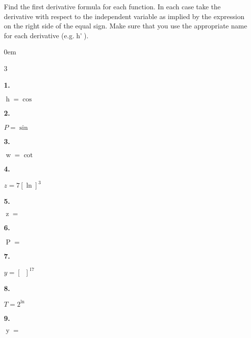 \documentclass[12pt,]{book}
\theoremstyle{plain}
\theoremstyle{definition}
\numberwithin{equation}{section}
\newenvironment{exercisegroup}%
{\medskip\noindent}%
{\par\bigskip}%
\newlength{\exercisegroupindent}%
\newlength{\exercisegroupitemwidth}%
\newenvironment{exercisegrouplist}%
{\vspace{-\partopsep}%
\begin{adjustwidth}{\exercisegroupindent}{0em}}%
{\end{adjustwidth}%
\vspace{-\partopsep}%
\vspace{\baselineskip}}%
\newenvironment{exercisegroupbycol}[1]%
{\begin{exercisegrouplist}%
\vspace{-\multicolsep}%
\begin{multicols}{#1}%
\setlength{\parindent}{0em}%
\setlength{\exercisegroupitemwidth}{\linewidth}}%
{\end{multicols}%
\vspace{-\multicolsep}%
\end{exercisegrouplist}}%
\newenvironment{exercisegroupitem}[1]%
{\begin{minipage}[t]{\exercisegroupitemwidth}
\vspace{0pt}%
{\bfseries#1}%
\rule{0pt}{\baselineskip}}{\strut%
\end{minipage}%
\hspace{\columnsep}}%
\providecommand\phantomsection{}
\newcommand{\fe}[2]{\mathop{{#1}{\left(#2\right)}}}
\newcommand{\fd}[1]{#1'}
\begin{document}
\begin{exercisegroup}%
Find the first derivative formula for each function.  In each case take the derivative with respect to the independent variable as implied by the expression on the right side of the equal sign.  Make sure that you use the appropriate name for each derivative (e.g.\@ \(\fe{\fd{h}}{t}\)).%
\begin{exercisegroupbycol}{3}%
\begin{exercisegroupitem}{1. }\phantomsection\hypertarget{exercise-280}{\null}
\(\fe{h}{t}=\fe{\cos}{\sqrt{t}}\)%
\end{exercisegroupitem}%
\par%
\begin{exercisegroupitem}{2. }\phantomsection\hypertarget{exercise-281}{\null}
\(P=\fe{\sin}{\theta^4}\)%
\end{exercisegroupitem}%
\par%
\begin{exercisegroupitem}{3. }\phantomsection\hypertarget{exercise-282}{\null}
\(\fe{w}{\alpha}=\fe{\cot}{\sqrt[3]{\alpha}}\)%
\end{exercisegroupitem}%
\par%
\begin{exercisegroupitem}{4. }\phantomsection\hypertarget{exercise-283}{\null}
\(z=7\left[\fe{\ln}{t}\right]^3\)%
\end{exercisegroupitem}%
\par%
\begin{exercisegroupitem}{5. }\phantomsection\hypertarget{exercise-284}{\null}
\(\fe{z}{\theta}=\fe{\sin^4}{\theta}\)%
\end{exercisegroupitem}%
\par%
\begin{exercisegroupitem}{6. }\phantomsection\hypertarget{exercise-285}{\null}
\(\fe{P}{\beta}=\fe{\tan^{-1}}{\beta}\)%
\end{exercisegroupitem}%
\par%
\begin{exercisegroupitem}{7. }\phantomsection\hypertarget{exercise-286}{\null}
\(y=\left[\fe{\sin^{-1}}{t}\right]^{17}\)%
\end{exercisegroupitem}%
\par%
\begin{exercisegroupitem}{8. }\phantomsection\hypertarget{exercise-287}{\null}
\(T=2^{\fe{\ln}{x}}\)%
\end{exercisegroupitem}%
\par%
\begin{exercisegroupitem}{9. }\phantomsection\hypertarget{exercise-288}{\null}
\(\fe{y}{x}=\fe{\sec^{-1}}{e^x}\)%
\end{exercisegroupitem}%
\par%
\end{exercisegroupbycol}%
\end{exercisegroup}%
\end{document}
